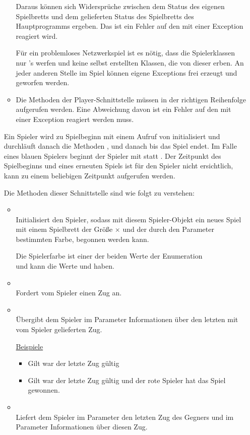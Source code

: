 \begin{enumerate}
\begin{itemize}
Daraus können sich Widersprüche zwischen dem Status des eigenen Spielbretts und dem gelieferten Status des Spielbretts des Hauptprogramms ergeben. Das ist ein Fehler auf den mit einer Exception reagiert wird.

Für ein problemloses Netzwerkspiel ist es nötig, dass die Spielerklassen nur 's werfen und keine selbst erstellten Klassen, die von dieser erben. An jeder anderen Stelle im Spiel können eigene Exceptions frei erzeugt und geworfen werden.

\item Die Methoden der Player-Schnittstelle müssen in der richtigen Reihenfolge aufgerufen werden. Eine Abweichung davon ist ein Fehler auf den mit einer Exception reagiert werden muss.
\end{itemize}

Ein Spieler wird zu Spielbeginn mit einem Aufruf von  initialisiert und durchläuft danach die Methoden ,  und danach  bis das Spiel endet. Im Falle eines blauen Spielers beginnt der Spieler mit  statt . Der Zeitpunkt des Spielbeginns und eines erneuten Spiels ist für den Spieler nicht ersichtlich,  kann zu einem beliebigen Zeitpunkt aufgerufen werden.

\newpage
Die Methoden dieser Schnittstelle sind wie folgt zu verstehen:

\begin{itemize}[leftmargin=4em]
\item[\code{init}] \hfill \\Initialisiert den Spieler, sodass mit diesem Spieler-Objekt ein neues Spiel mit einem Spielbrett der Größe  $\times$  und der durch den Parameter  bestimmten Farbe, begonnen werden kann.

Die Spielerfarbe ist einer der beiden Werte der Enumeration \\
 und kann die Werte  und  haben.
\item[\code{request}] \hfill \\Fordert vom Spieler einen Zug an.
\item[\code{confirm}] \hfill \\Übergibt dem Spieler im Parameter  Informationen über den letzten mit  vom Spieler gelieferten Zug.

\underline{Beispiele}
\begin{itemize}
\item Gilt  war der letzte Zug gültig
\item Gilt  war der letzte Zug gültig und der rote Spieler hat das Spiel gewonnen.
\end{itemize}
\item[\code{update}] \hfill \\Liefert dem Spieler im Parameter  den letzten Zug des Gegners und im Parameter  Informationen über diesen Zug.
\end{itemize}


\end{enumerate}
